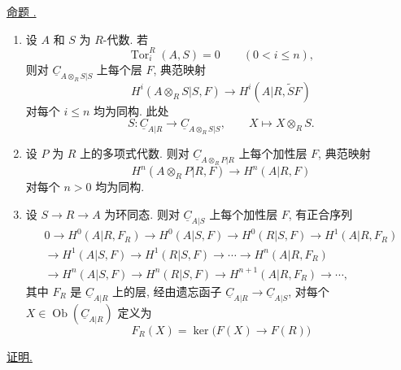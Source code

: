 
\underline{命题 .}

\begin{enumerate}[label=(\alph*)]
\item 设 $A$ 和 $S$ 为 $R$-代数. 若
\[
 \operatorname{Tor}_i^R(A,S)=0\qquad(0<i\leq n),
\]
则对 $\underline C_{A\otimes_RS|S}$ 上每个层 $F$, 典范映射
\[
 H^i(A\otimes_RS|S,F)
 \longrightarrow H^i(A|R,\widetilde SF)
\]
对每个 $i\leq n$ 均为同构. 此处
\[
 S:\underline C_{A|R}\longrightarrow
 \underline C_{A\otimes_RS|S},
 \qquad X\longmapsto X\otimes_RS.
\]

\item 设 $P$ 为 $R$ 上的多项式代数.
则对 $\underline C_{A\otimes_RP|R}$ 上每个加性层 $F$, 典范映射
\[
 H^n(A\otimes_RP|R,F)\longrightarrow H^n(A|R,F)
\]
对每个 $n>0$ 均为同构.

\item 设 $S\longrightarrow R\longrightarrow A$ 为环同态.
则对 $\underline C_{A|S}$ 上每个加性层 $F$, 有正合序列
\begin{multline*}
0\longrightarrow H^0(A|R,F_R)\longrightarrow H^0(A|S,F)
\longrightarrow H^0(R|S,F)\longrightarrow H^1(A|R,F_R)\\
\longrightarrow H^1(A|S,F)\longrightarrow H^1(R|S,F)
\longrightarrow\cdots\longrightarrow H^n(A|R,F_R)\\
\longrightarrow H^n(A|S,F)\longrightarrow H^n(R|S,F)
\longrightarrow H^{n+1}(A|R,F_R)\longrightarrow\cdots,
\end{multline*}
其中 $F_R$ 是 $\underline C_{A|R}$ 上的层,
经由遗忘函子 $\underline C_{A|R}\longrightarrow\underline C_{A|S}$,
对每个 $X\in\operatorname{Ob}(\underline C_{A|R})$ 定义为
\[
 F_R(X)=\ker\bigl(F(X)\longrightarrow F(R)\bigr)
\]
\end{enumerate}

\underline{证明.}

